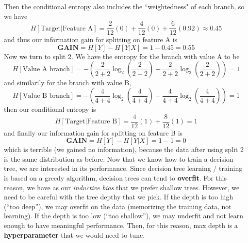 \documentclass[11 pt]{scrartcl}
\begin{document}
Then the conditional entropy also includes the ``weightedness" of each branch, so we have
$$
H[\text{Target}|\text{Feature A}] = \frac{2}{12}(0) + \frac{4}{12}(0) + \frac{6}{12}(0.92) \approx 0.45
$$
and thus our information gain for splitting on feature A is
$$
\textbf{GAIN} = H[Y] - H[Y|X] = 1 - 0.45 = 0.55
$$
Now we turn to split 2. We have the entropy for the branch with value A to be
$$
H[\text{Value A branch}] = -\left(\frac{2}{2 + 2}\log_2\left(\frac{2}{2 + 2}\right) + \frac{2}{2 + 2}\log_2\left(\frac{2}{2 + 2}\right) \right) = 1
$$
and similarily for the branch with value B,
$$
H[\text{Value B branch}] = -\left(\frac{4}{4 + 4}\log_2\left(\frac{4}{4 + 4}\right) + \frac{4}{4 + 4}\log_2\left(\frac{4}{4 + 4}\right) \right) = 1
$$
then our conditional entropy is
$$
H[\text{Target}|\text{Feature B}] = \frac{4}{12}(1) + \frac{8}{12}(1) = 1
$$
and finally our information gain for splitting on feature B is
$$
\textbf{GAIN} = H[Y] - H[Y|X] = 1 - 1 = 0
$$
which is terrible (we gained no information), because the data after using split 2 is the same distribution as before.
\newpage
Now that we know how to train a decision tree, we are interested in its performance. Since decision tree learning / training is based on a greedy algorithm, decision trees can tend to \textbf{overfit}. For this reason, we have as our \textit{inductive bias} that we prefer shallow trees. However, we need to be careful with the tree depthy that we pick. If the depth is too high (``too deep''), we may overfit on the data (memorizing the training data, not learning). If the depth is too low (``too shallow''), we may underfit and not learn enough to have meaningful performance. Then, for this reason, max depth is a \textbf{hyperparameter} that we would need to tune.
\end{document}
